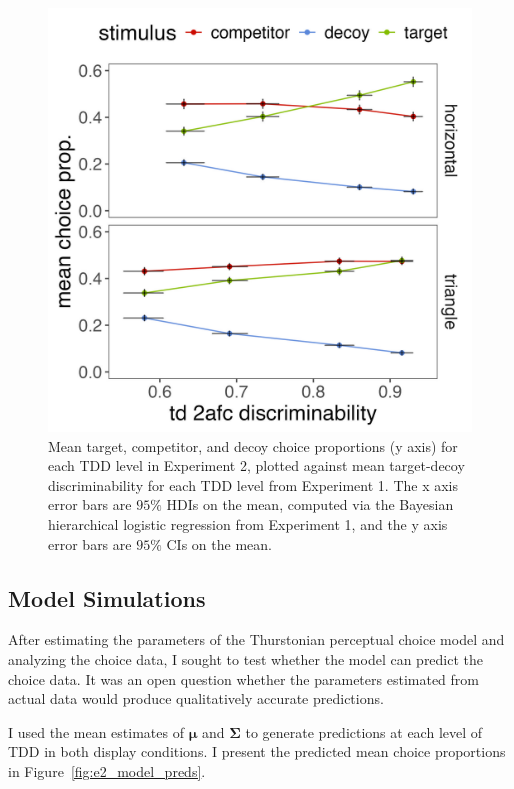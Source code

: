 \begin{figure}
   \includegraphics[width=\textwidth]{figures/choicePhase_att_trials_compare_to_2afc_collapsed.jpeg}
   \caption{Mean target, competitor, and decoy choice proportions (y axis) for each TDD level in Experiment 2, plotted against mean target-decoy discriminability for each TDD level from Experiment 1. The x axis error bars are $95\%$ HDIs on the mean, computed via the Bayesian hierarchical logistic regression from Experiment 1, and the y axis error bars are $95\%$ CIs on the mean.}
   \label{fig:e2_choice_compare_to_2afc}
\end{figure}

\subsection{Model Simulations}
After estimating the parameters of the Thurstonian perceptual choice model and analyzing the choice data, I sought to test whether the model can predict the choice data. It was an open question whether the parameters estimated from actual data would produce qualitatively accurate predictions.

I used the mean estimates of $\boldsymbol{\mu}$ and $\boldsymbol{\Sigma}$ to generate predictions at each level of TDD in both display conditions. I present the predicted mean choice proportions in Figure~\ref{fig:e2_model_preds}. 

